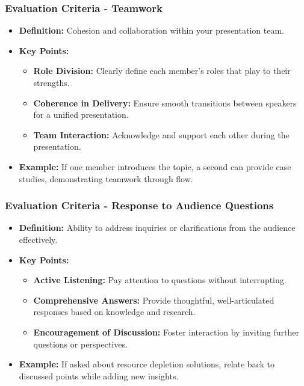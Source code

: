 \documentclass[aspectratio=169]{beamer}
\begin{document}
\begin{frame}[fragile]
    \frametitle{Evaluation Criteria - Teamwork}
    \begin{itemize}
        \item \textbf{Definition:} Cohesion and collaboration within your presentation team.
        \item \textbf{Key Points:}
        \begin{itemize}
            \item \textbf{Role Division:} Clearly define each member's roles that play to their strengths.
            \item \textbf{Coherence in Delivery:} Ensure smooth transitions between speakers for a unified presentation.
            \item \textbf{Team Interaction:} Acknowledge and support each other during the presentation.
        \end{itemize}
        \item \textbf{Example:} If one member introduces the topic, a second can provide case studies, demonstrating teamwork through flow.
    \end{itemize}
\end{frame}

\begin{frame}[fragile]
    \frametitle{Evaluation Criteria - Response to Audience Questions}
    \begin{itemize}
        \item \textbf{Definition:} Ability to address inquiries or clarifications from the audience effectively.
        \item \textbf{Key Points:}
        \begin{itemize}
            \item \textbf{Active Listening:} Pay attention to questions without interrupting.
            \item \textbf{Comprehensive Answers:} Provide thoughtful, well-articulated responses based on knowledge and research.
            \item \textbf{Encouragement of Discussion:} Foster interaction by inviting further questions or perspectives.
        \end{itemize}
        \item \textbf{Example:} If asked about resource depletion solutions, relate back to discussed points while adding new insights.
    \end{itemize}
\end{frame}
\end{document}
